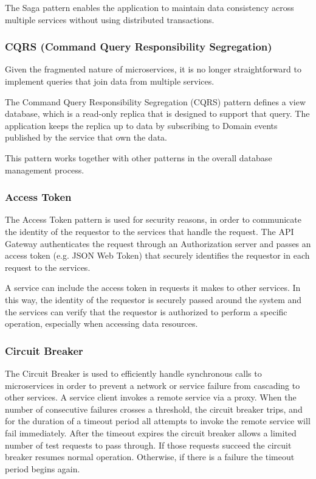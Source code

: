 The Saga pattern enables the application to maintain data consistency across multiple services without using distributed transactions.

\subsubsection{CQRS (Command Query Responsibility Segregation)}
Given the fragmented nature of microservices, it is no longer straightforward to implement queries that join data from multiple services. 

The Command Query Responsibility Segregation (CQRS) pattern defines a view database, which is a read-only replica that is designed to support that query. The application keeps the replica up to data by subscribing to Domain events published by the service that own the data. 

This pattern works together with other patterns in the overall database management process.

\subsubsection{Access Token}
The Access Token pattern is used for security reasons, in order to communicate the identity of the requestor to the services that handle the request. The API Gateway authenticates the request through an Authorization server and passes an access token (e.g. JSON Web Token) that securely identifies the requestor in each request to the services. 

A service can include the access token in requests it makes to other services. In this way, the identity of the requestor is securely passed around the system and the services can verify that the requestor is authorized to perform a specific operation, especially when accessing data resources.

\subsubsection{Circuit Breaker}
The Circuit Breaker is used to efficiently handle synchronous calls to microservices in order to prevent a network or service failure from cascading to other services.
A service client invokes a remote service via a proxy. When the number of consecutive failures crosses a threshold, the circuit breaker trips, and for the duration of a timeout period all attempts to invoke the remote service will fail immediately. After the timeout expires the circuit breaker allows a limited number of test requests to pass through. If those requests succeed the circuit breaker resumes normal operation. Otherwise, if there is a failure the timeout period begins again.

